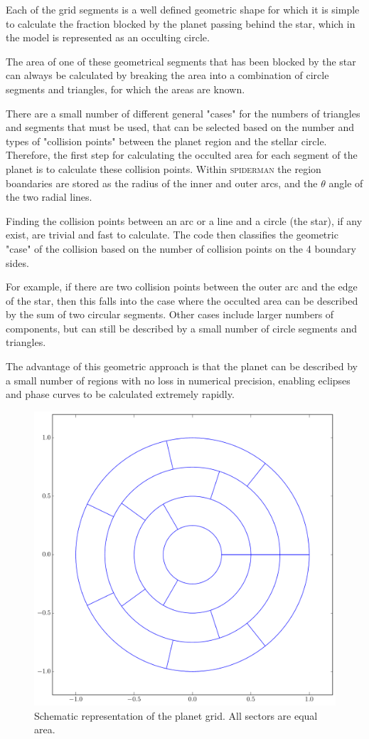 \documentclass[a4paper,fleqn,usenatbib]{mnras}
\begin{document}
Each of the grid segments is a well defined geometric shape for which it is simple to calculate the fraction blocked by the planet passing behind the star, which in the model is represented as an occulting circle.

The area of one of these geometrical segments that has been blocked by the star can always be calculated by breaking the area into a combination of circle segments and triangles, for which the areas are known.

There are a small number of different general "cases" for the numbers of triangles and segments that must be used, that can be selected based on the number and types of "collision points" between the planet region and the stellar circle. Therefore, the first step for calculating the occulted area for each segment of the planet is to calculate these collision points. Within \textsc{spiderman} the region boandaries are stored as the radius of the inner and outer arcs, and the $\theta$ angle of the two radial lines.

Finding the collision points between an arc or a line and a circle (the star), if any exist, are trivial and fast to calculate. The code then classifies the geometric "case" of the collision based on the number of collision points on the 4 boundary sides.

For example, if there are two collision points between the outer arc and the edge of the star, then this falls into the case where the occulted area can be described by the sum of two circular segments. Other cases include larger numbers of components, but can still be described by a small number of circle segments and triangles.

The advantage of this geometric approach is that the planet can be described by a small number of regions with no loss in numerical precision, enabling eclipses and phase curves to be calculated extremely rapidly.

\begin{figure}
\begin{center}
\includegraphics[width=0.8\columnwidth]{img/frame1.pdf}
\caption{Schematic representation of the planet grid. All sectors are equal area.}
\label{fig:schematic}
\end{center}
\end{figure}
\end{document}
